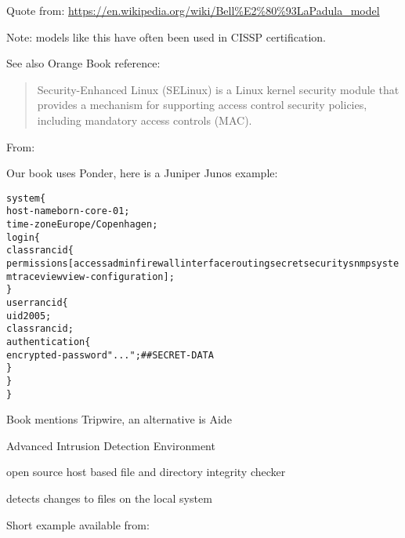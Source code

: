 \documentclass[Screen16to9,17pt]{foils}
\begin{document}
Quote from:
\url{https://en.wikipedia.org/wiki/Bell%E2%80%93LaPadula_model}

Note: models like this have often been used in CISSP certification.

See also Orange Book reference:\\ 


\begin{quote}
Security-Enhanced Linux (SELinux) is a Linux kernel security module that provides a mechanism for supporting access control security policies, including mandatory access controls (MAC).
\end{quote}
From:



Our book uses Ponder, here is a Juniper Junos example:
\begin{alltt}\footnotesize
  system \{
      host-name born-core-01;
      time-zone Europe/Copenhagen;
      login \{
          class rancid \{
              permissions [ access admin firewall interface routing secret security snmp system trace view view-configuration ];
          \}
          user rancid \{
                   uid 2005;
                   class rancid;
                   authentication \{
                       encrypted-password "..."; ## SECRET-DATA
                   \}
               \}
           \}
\end{alltt}


\begin{list1}
\item Book mentions Tripwire, an alternative is Aide
\item Advanced Intrusion Detection Environment
\item open source host based file and directory integrity checker
\item detects changes to files on the local system
\item Short example available from:\\
{\footnotesize{}}
\item {}
\end{list1}
\end{document}
